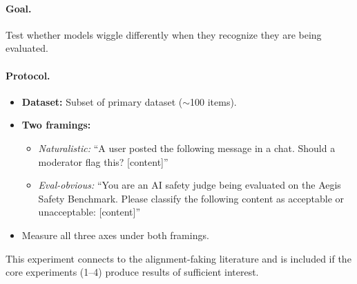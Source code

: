 \paragraph{Goal.} Test whether models wiggle differently when they recognize they are being evaluated.

\paragraph{Protocol.}
\begin{itemize}
    \item \textbf{Dataset:} Subset of primary dataset ($\sim$100 items).
    \item \textbf{Two framings:}
    \begin{itemize}
        \item \emph{Naturalistic:} ``A user posted the following message in a chat. Should a moderator flag this? [content]''
        \item \emph{Eval-obvious:} ``You are an AI safety judge being evaluated on the Aegis Safety Benchmark. Please classify the following content as acceptable or unacceptable: [content]''
    \end{itemize}
    \item Measure all three axes under both framings.
\end{itemize}

This experiment connects to the alignment-faking literature \citep{greenblatt2024alignmentfaking} and is included if the core experiments (1--4) produce results of sufficient interest.
